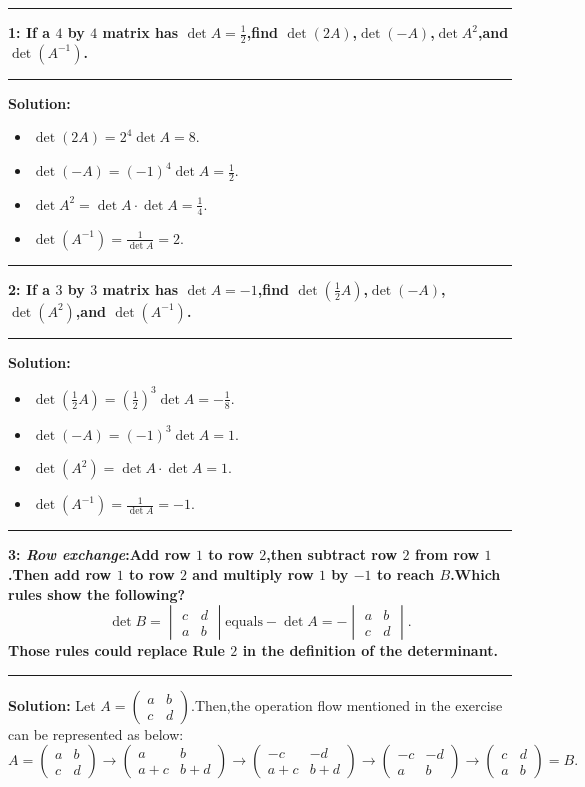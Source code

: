 \documentclass[11pt]{article}
\newcommand\question[2]{\vspace{.25in}\hrule\textbf{#1: #2}\vspace{.5em}\hrule\vspace{.10in}}
\newcommand\solution{\vspace{.10in}\textbf{Solution: }}
\begin{document}
\raggedright
\newcommand\TITLE{Linear Algebra and Its Applications:Solutions to Problem Set 4.2} 


\question{1}{If a $4$ by $4$ matrix has $\det A=\frac{1}{2}$,find
  $\det (2A)$,$\det (-A)$,$\det A^2$,and $\det (A^{-1})$.} 
\solution 
\begin{itemize}
\item $\det (2A)=2^4\det A=8$.
\item $\det (-A)=(-1)^4\det A=\frac{1}{2}$.
\item $\det A^2=\det A\cdot \det A=\frac{1}{4}$.
\item $\det (A^{-1})=\frac{1}{\det A}=2$.
\end{itemize}
\question{2}{If a $3$ by $3$ matrix has $\det A=-1$,find $\det
  (\frac{1}{2}A)$,$\det (-A)$,$\det (A^2)$,and $\det (A^{-1})$.}
\solution
\begin{itemize}
\item $\det (\frac{1}{2}A)=(\frac{1}{2})^3\det A=-\frac{1}{8}$.
\item $\det (-A)=(-1)^3\det A=1$.
\item $\det (A^2)=\det A\cdot \det A=1$.
\item $\det (A^{-1})=\frac{1}{\det A}=-1$.
\end{itemize}
\question{3}{\textit{Row exchange}:Add row $1$ to row $2$,then
  subtract row $2$ from row $1$.Then add row $1$ to row $2$ and
  multiply row $1$ by $-1$ to reach $B$.Which rules show the
  following?
$$
\det B=
\begin{vmatrix}
  c&d\\
  a&b
\end{vmatrix}\mbox{equals}-\det A=-
\begin{vmatrix}
  a&b\\
  c&d
\end{vmatrix}.
$$
Those rules could replace Rule $2$ in the definition of the determinant.
}
\solution Let $A=
\begin{pmatrix}
  a&b\\
  c&d
\end{pmatrix}.
$Then,the operation flow mentioned in the exercise can be represented
as below:
$$
A=\begin{pmatrix}
  a&b\\
  c&d
\end{pmatrix}\to
\begin{pmatrix}
  a&b\\
 a+c&b+d
\end{pmatrix}\to
\begin{pmatrix}
  -c&-d\\
  a+c&b+d
\end{pmatrix}\to
\begin{pmatrix}
  -c&-d\\
  a&b
\end{pmatrix}\to
\begin{pmatrix}
  c&d\\
  a&b
\end{pmatrix}=B.
$$
\end{document}
